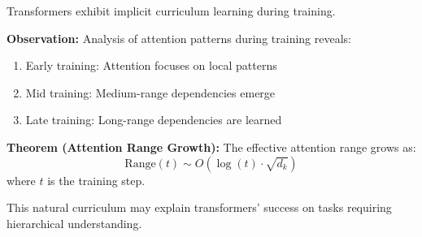 Transformers exhibit implicit curriculum learning during training.

\textbf{Observation:} Analysis of attention patterns during training reveals:
\begin{enumerate}
    \item Early training: Attention focuses on local patterns
    \item Mid training: Medium-range dependencies emerge
    \item Late training: Long-range dependencies are learned
\end{enumerate}

\textbf{Theorem (Attention Range Growth):} The effective attention range grows as:
\begin{equation}
\text{Range}(t) \sim O(\log(t) \cdot \sqrt{d_k})
\end{equation}
where $t$ is the training step.

This natural curriculum may explain transformers' success on tasks requiring hierarchical understanding.
